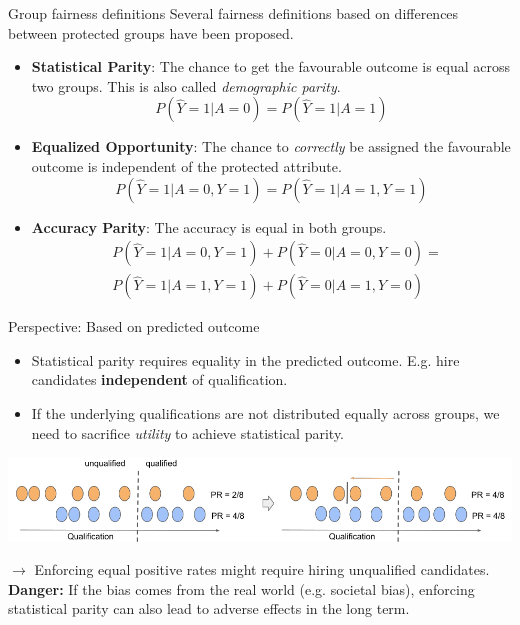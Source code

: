 \documentclass[11pt,compress,t,notes=noshow, xcolor=table]{beamer}
\begin{document}
\begin{vbframe}{Group fairness definitions}
    Several fairness definitions based on differences between protected groups have been proposed.
    \begin{itemize}
        \item \textbf{Statistical Parity}: The chance to get the favourable outcome is equal across two groups. This is also called \textit{demographic parity}.
        $$P(\hat{Y} = 1 | A = 0) = P(\hat{Y} = 1 | A = 1)$$

        \item \textbf{Equalized Opportunity}: The chance to \emph{correctly} be assigned the favourable outcome is independent of the protected attribute. 
        $$P(\hat{Y} = 1 | A = 0, Y = 1) = P(\hat{Y} = 1 | A = 1, Y = 1)$$

        \item \textbf{Accuracy Parity}: The accuracy is equal in both groups.
        \begin{equation*}
            \begin{aligned}
                & P(\hat{Y} = 1 | A = 0, Y = 1) + P(\hat{Y} = 0 | A = 0, Y = 0) = \\
                & P(\hat{Y} = 1 | A = 1, Y = 1) + P(\hat{Y} = 0 | A = 1, Y = 0)
            \end{aligned}
        \end{equation*}
    \end{itemize}
\end{vbframe}

\begin{vbframe}{Perspective: Based on predicted outcome}
    \textbf{}
    \begin{itemize}
        \item Statistical parity requires equality in the predicted outcome. E.g. hire candidates \textbf{independent} of qualification.
        \item If the underlying qualifications are not distributed equally across groups, we need to sacrifice \emph{utility} to achieve statistical parity.
    \end{itemize}
    
    \begin{center}
        \includegraphics[]{figures/statistical_parity}
    \end{center}
    $\rightarrow$ Enforcing equal positive rates might require hiring unqualified candidates.\\
    \textbf{Danger:} If the bias comes from the real world (e.g. societal bias), enforcing statistical parity can also lead to adverse effects in the long term.
\end{vbframe}
\end{document}
